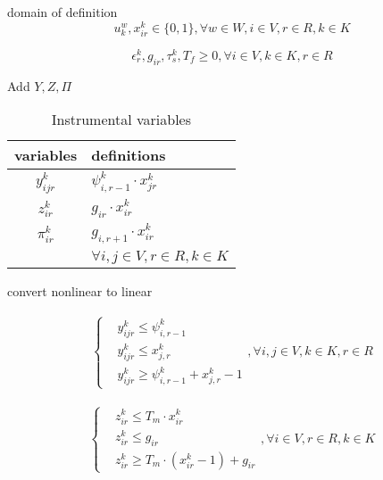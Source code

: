 \documentclass[preprint,12pt,authoryear]{elsarticle}
\begin{document}
domain of definition
\begin{equation}
    u_k^w,x_{ir}^k\in \{0,1\}, \forall w\in W, i\in V,r\in R,k\in K
\label{ddb}
\end{equation}

\begin{equation}
    \epsilon_r^k,g_{ir},\tau_s^k,T_f\geq 0,\forall i\in V, k\in K,r\in R
\label{ddc}
\end{equation}

Add $Y,Z,\Pi$
\begin{longtable}{cl}%
    \caption{Instrumental variables}\label{tab2}\\
    \toprule [2pt] %
    variables& definitions \\
    \midrule [1pt]  
    $y_{ijr}^k$& $\psi_{i,r-1}^k\cdot x_{jr}^k$ \\
    $z_{ir}^k$& $g_{ir}\cdot x_{ir}^k$ \\
    $\pi_{ir}^k$& $g_{i,r+1}\cdot x_{ir}^k$ \\
    &$\forall i,j\in V, r\in R, k\in K$ \\
    \bottomrule [2pt]
\end{longtable}

convert nonlinear to linear

\begin{equation}
    \begin{split}
        \begin{cases}
            & y_{ijr}^k\leq \psi_{i,r-1}^k \\
            & y_{ijr}^k\leq x_{j,r}^k \\
            & y_{ijr}^k\geq \psi_{i,r-1}^k+x_{j,r}^k-1
        \end{cases}, \forall i,j\in V,k\in K,r\in R
    \end{split}
    \label{nly}
\end{equation}

\begin{equation}
    \begin{split}
        \begin{cases}
            & z_{ir}^k\leq T_m\cdot x_{ir}^k \\
            & z_{ir}^k\leq g_{ir}\\
            & z_{ir}^k\geq T_m\cdot(x_{ir}^k -1) + g_{ir}
        \end{cases}, \forall i\in V, r\in R, k\in K
    \end{split}
    \label{nlz}
\end{equation}
\end{document}
